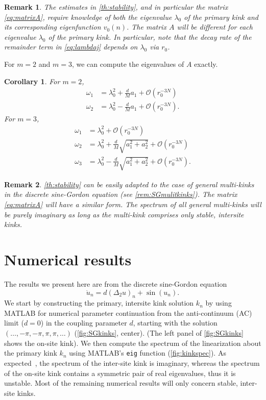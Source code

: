 \documentclass[12pt,reqno]{amsart}
\newtheorem{corollary}{Corollary}
\newtheorem{remark}{Remark}
\begin{document}
\begin{remark}\label{remark:kk}
The estimates in \cref{th:stability}, and in particular the matrix \cref{eq:matrixA}, require knowledge of both the eigenvalue $\lambda_0$ of the primary kink and its corresponding eigenfunction $v_0(n)$. The matrix $A$ will be different for each eigenvalue $\lambda_0$ of the primary kink. In particular, note that the decay rate of the remainder term in \cref{eq:lambdaj} depends on $\lambda_0$ via $r_0$.
\end{remark}

\noindent For $m = 2$ and $m = 3$, we can compute the eigenvalues of $A$ exactly.

\begin{corollary}\label{corr:m23}
For $m = 2$, 
\begin{align*}
	\omega_1 &= \lambda_0^2 + \frac{d}{M}a_1 + \mathcal{O}(r_0^{-3N}) \\
	\omega_2 &= \lambda_0^2 - \frac{d}{M}a_1 + \mathcal{O}(r_0^{-3N}).
\end{align*}
For $m = 3$,
\begin{align*}
	\omega_1 &= \lambda_0^2 + \mathcal{O}(r_0^{-3N}) \\
	\omega_2 &= \lambda_0^2 + \frac{d}{M}\sqrt{a_1^2 + a_2^2} + \mathcal{O}(r_0^{-3N}) \\
	\omega_3 &= \lambda_0^2 - \frac{d}{M}\sqrt{a_1^2 + a_2^2} + \mathcal{O}(r_0^{-3N}).
\end{align*}
\end{corollary}

\begin{remark}
\cref{th:stability} can be easily adapted to the case of general multi-kinks in the discrete sine-Gordon equation (see \cref{rem:SGmulitkinks}). The matrix \cref{eq:matrixA} will have a similar form. The spectrum of all general multi-kinks will be purely imaginary as long as the multi-kink comprises only stable, intersite kinks.
\end{remark}

\section{Numerical results}\label{sec:numerics}

The results we present here are from the discrete sine-Gordon equation
\begin{equation*}
	\ddot{u}_n = d (\Delta_2 u)_n + \sin(u_n).
\end{equation*}
We start by constructing the primary, intersite kink solution $k_n$ by using MATLAB for numerical parameter continuation from the anti-continuum (AC) limit ($d = 0$) in the coupling parameter $d$, starting with the solution $(\dots, -\pi, -\pi, \pi, \pi, \dots)$ (\cref{fig:SGkinks}, center). (The left panel of \cref{fig:SGkinks} shows the on-site kink). We then compute the spectrum of the linearization about the primary kink $k_n$ using MATLAB's \texttt{eig} function (\cref{fig:kinkspec}). As expected~\cite{Balmforth2000,KevrekidisWeinstein2000}, the spectrum of the inter-site kink is imaginary, whereas the spectrum of the on-site kink contains a symmetric pair of real eigenvalues, thus it is unstable. Most of the remaining numerical results will only concern stable, inter-site kinks.
\end{document}
